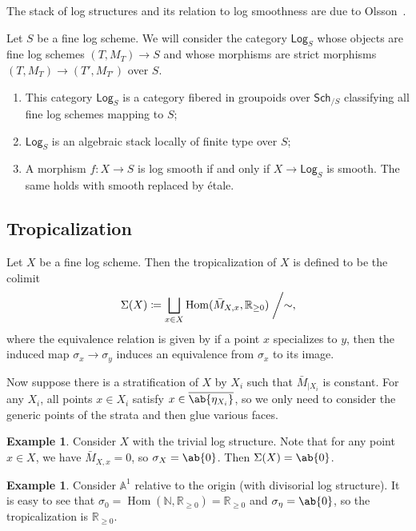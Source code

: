 \documentclass{amsart}
\theoremstyle{definition}
\newtheorem{exm}[thm]{Example}
\theoremstyle{remark}
\theoremstyle{plain}
\theoremstyle{definition}
\theoremstyle{remark}
\newcommand{\A}{\mathbb{A}}
\newcommand{\N}{\mathbb{N}}
\newcommand{\R}{\mathbb{R}}
\newcommand{\ms}[1]{\mathsf{#1}}
\newcommand{\ol}[1]{\overline{#1}}
\newcommand{\1}{\mathbf{1}}
\newcommand{\2}{\mathbf{2}}
\newcommand{\3}{\mathbf{3}}
\DeclareMathOperator{\Hom}{Hom}
\begin{document}
The stack of log structures and its relation to log smoothness are due to Olsson~\cite{Olsson2003}.

Let \(S\) be a fine log scheme. We will consider the category \(\ms{Log}_S\) whose objects are fine log schemes \((T, M_T) \to S\) and whose morphisms are strict morphisms \((T, M_T) \to (T', M_{T'})\) over \(S\).
\begin{enumerate}
    \item This category \(\ms{Log}_S\) is a category fibered in groupoids over \(\ms{Sch}_{/S}\) classifying all fine log schemes mapping to \(S\);
    \item \(\ms{Log}_S\) is an algebraic stack locally of finite type over \(S\);
    \item A morphism \(f \colon X \to S\) is log smooth if and only if \(X \to \ms{Log}_S\) is smooth. The same holds with smooth replaced by \'etale.
\end{enumerate}

\subsection{Tropicalization}%
\label{sub:Tropicalization}

Let \(X\) be a fine log scheme. Then the tropicalization of \(X\) is defined to be the colimit
\[\Sigma(X) \coloneqq \bigsqcup_{x \in X} \Hom(\bar{M}_{X,x}, \R_{\geq 0}) \biggm/ \sim, \]
where the equivalence relation is given by if a point \(x\) specializes to \(y\), then the induced map \(\sigma_x \to \sigma_y\) induces an equivalence from \(\sigma_x\) to its image. 

Now suppose there is a stratification of \(X\) by \(X_i\) such that \(\bar{M}_{|X_i}\) is constant. For any \(X_i\), all points \(x \in X_i\) satisfy \(x \in \ol{\ab\{\eta_{X_i}\}}\), so we only need to consider the generic points of the strata and then glue various faces. 

\begin{exm}
    Consider \(X\) with the trivial log structure. Note that for any point \(x \in X\), we have \(\bar{M}_{X,x} = 0\), so \(\sigma_X = \ab\{0\}\). Then \(\Sigma(X) = \ab\{0\}\).
\end{exm}

\begin{exm}
    Consider \(\A^1\) relative to the origin (with divisorial log structure). It is easy to see that \(\sigma_0 = \Hom(\N, \R_{\geq 0}) = \R_{\geq 0}\) and \(\sigma_{\eta} = \ab\{0\}\), so the tropicalization is \(\R_{\geq 0}\).
\end{exm}
\end{document}
